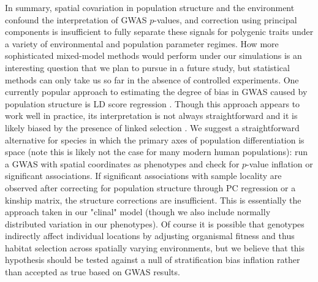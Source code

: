 \documentclass[11pt,twoside,lineno]{preprint}
\newif\ifcomments
\newcommand{\cjb}[1]{\ifcomments{{\color{orange} \it (#1)}}\else{}\fi}
\begin{document}
In summary, spatial covariation in population structure and the environment confound the interpretation of GWAS $p$-values, and correction using principal components is insufficient to fully separate these signals for polygenic traits under a variety of environmental and population parameter regimes. How more sophisticated mixed-model methods would perform under our simulations is an interesting question that we plan to pursue in a future study, but statistical methods can only take us so far in the absence of controlled experiments. One currently popular approach to estimating the degree of bias in GWAS caused by population structure is LD score regression \citep{Bulik-Sullivan2015}. Though this approach appears to work well in practice, its interpretation is not always straightforward and it is likely biased by the presence of linked selection \citep{Berg2018}. We suggest a straightforward alternative for species in which the primary axes of population differentiation is space (note this is likely not the case for many modern human populations): run a GWAS with spatial coordinates as phenotypes and check for $p$-value inflation or significant associations. If significant associations with sample locality are observed after correcting for population structure through PC regression or a kinship matrix, the structure corrections are insufficient. This is essentially the approach taken in our "clinal" model (though we also include normally distributed variation in our phenotypes). Of course it is possible that genotypes indirectly affect individual locations by adjusting organismal fitness and thus habitat selection across spatially varying environments, but we believe that this hypothesis should be tested against a null of stratification bias inflation rather than accepted as true based on GWAS results.  \cjb{what do you think of the second half here?}
\end{document}
